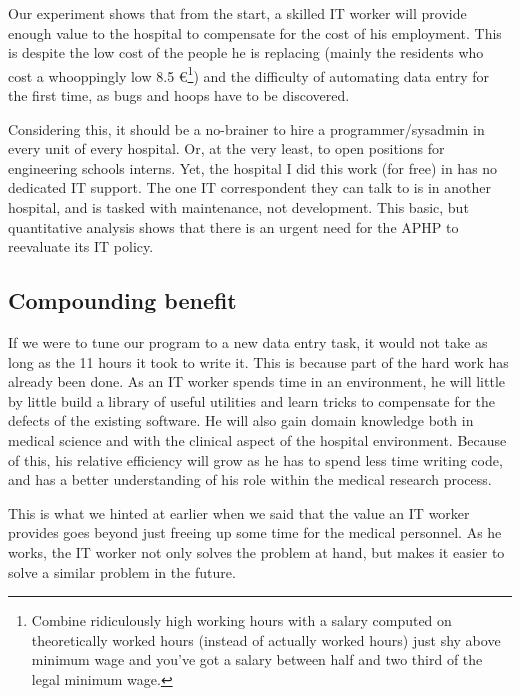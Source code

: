 \documentclass[nobib]{tufte-handout}
\begin{document}
Our experiment shows that from the start, a skilled IT worker will provide enough value to the hospital to compensate for the cost of his employment. This is despite the low cost of the people he is replacing (mainly the residents who cost a whooppingly low 8.5 €\footnote{Combine ridiculously high working hours with a salary computed on theoretically worked hours (instead of actually worked hours) just shy above minimum wage and you've got a salary between half and two third of the legal minimum wage.}) and the difficulty of automating data entry for the first time, as bugs and hoops have to be discovered.




Considering this, it should be a no-brainer to hire a programmer/sysadmin in every unit of every hospital. Or, at the very least, to open positions for engineering schools interns. Yet, the hospital I did this work (for free) in has no dedicated IT support. The one IT correspondent they can talk to is in another hospital, and is tasked with maintenance, not development. This basic, but quantitative analysis shows that there is an urgent need for the APHP to reevaluate its IT policy.

\subsection{Compounding benefit}
\label{sec:compounding}

If we were to tune our program to a new data entry task, it would not take as long as the 11 hours it took to write it. This is because part of the hard work has already been done. As an IT worker spends time in an environment, he will little by little build a library of useful utilities and learn tricks to compensate for the defects of the existing software. He will also gain domain knowledge both in medical science and with the clinical aspect of the hospital environment. Because of this, his relative efficiency will grow as he has to spend less time writing code, and has a better understanding of his role within the medical research process.

This is what we hinted at earlier when we said that the value an IT worker provides goes beyond just freeing up some time for the medical personnel. As he works, the IT worker not only solves the problem at hand, but makes it easier to solve a similar problem in the future.
\end{document}
